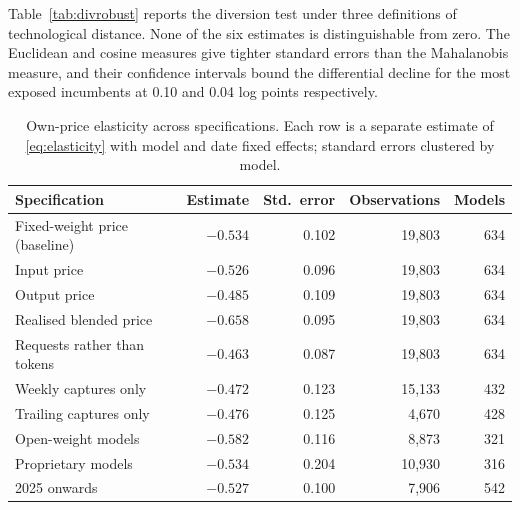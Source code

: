 \documentclass{article}
\begin{document}
Table~\ref{tab:divrobust} reports the diversion test under three definitions of
technological distance. None of the six estimates is distinguishable from zero. The
Euclidean and cosine measures give tighter standard errors than the Mahalanobis measure,
and their confidence intervals bound the differential decline for the most exposed
incumbents at 0.10 and 0.04 log points respectively.

\begin{table}[h]
\caption{Own-price elasticity across specifications. Each row is a separate estimate of
\eqref{eq:elasticity} with model and date fixed effects; standard errors clustered by
model.}
\label{tab:robust}
\centering
\small
\begin{tabular}{lrrrr}
\toprule
Specification & Estimate & Std.\ error & Observations & Models \\
\midrule
Fixed-weight price (baseline) & $-0.534$ & 0.102 & 19{,}803 & 634 \\
Input price                   & $-0.526$ & 0.096 & 19{,}803 & 634 \\
Output price                  & $-0.485$ & 0.109 & 19{,}803 & 634 \\
Realised blended price        & $-0.658$ & 0.095 & 19{,}803 & 634 \\
Requests rather than tokens   & $-0.463$ & 0.087 & 19{,}803 & 634 \\
Weekly captures only          & $-0.472$ & 0.123 & 15{,}133 & 432 \\
Trailing captures only        & $-0.476$ & 0.125 & 4{,}670 & 428 \\
Open-weight models            & $-0.582$ & 0.116 & 8{,}873 & 321 \\
Proprietary models            & $-0.534$ & 0.204 & 10{,}930 & 316 \\
2025 onwards                  & $-0.527$ & 0.100 & 7{,}906 & 542 \\
\bottomrule
\end{tabular}
\end{table}
\end{document}
